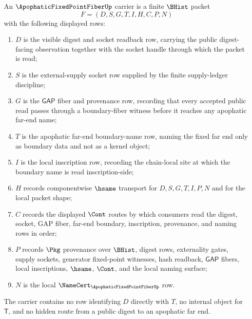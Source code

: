 \begin{definition}
\label{def:apophatic-fixed-point-fiber-carrier}
An $\ApophaticFixedPointFiberUp$ carrier is a finite $\BHist$ packet
$$
F=(D,S,G,T,I,H,C,P,N)
$$
with the following displayed rows:
\begin{enumerate}
\item $D$ is the visible digest and socket readback row, carrying the public digest-facing observation together with the socket handle through which the packet is read;
\item $S$ is the external-supply socket row supplied by the finite supply-ledger discipline;
\item $G$ is the $\mathsf{GAP}$ fiber and provenance row, recording that every accepted public read passes through a boundary-fiber witness before it reaches any apophatic far-end name;
\item $T$ is the apophatic far-end boundary-name row, naming the fixed far end only as boundary data and not as a kernel object;
\item $I$ is the local inscription row, recording the chain-local site at which the boundary name is read inscription-side;
\item $H$ records componentwise $\hsame$ transport for $D,S,G,T,I,P,N$ and for the local packet shape;
\item $C$ records the displayed $\Cont$ routes by which consumers read the digest, socket, GAP fiber, far-end boundary, inscription, provenance, and naming rows in order;
\item $P$ records $\Pkg$ provenance over $\BHist$, digest rows, externality gates, supply sockets, generator fixed-point witnesses, hash readback, $\mathsf{GAP}$ fibers, local inscriptions, $\hsame$, $\Cont$, and the local naming surface;
\item $N$ is the local $\NameCert_{\ApophaticFixedPointFiberUp}$ row.
\end{enumerate}
The carrier contains no row identifying $D$ directly with $T$, no internal object for $\mathsf{T}$, and no hidden route from a public digest to an apophatic far end.
\end{definition}

